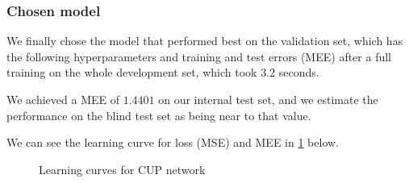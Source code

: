 \subsubsection{Chosen model}
We finally chose the model that performed best on the validation set, which has the following hyperparameters and training and test errors (MEE) after a full training on the whole development set, which took $3.2$ seconds.

\begin{table}[htb]
    \centering
    \caption{Hyperparameters and training and test error of the chosen model after a full training on the whole development set}
    \label{table:final_train_results}
\end{table}
We achieved a MEE of $1.4401$ on our internal test set, and we estimate the performance on the blind test set as being near to that value.

We can see the learning curve for loss (MSE) and MEE in \cref{fig:cup_plots} below.

\begin{figure}[h]
    \centering
    \caption{Learning curves for CUP network}
    \label{fig:cup_plots}
\end{figure}


